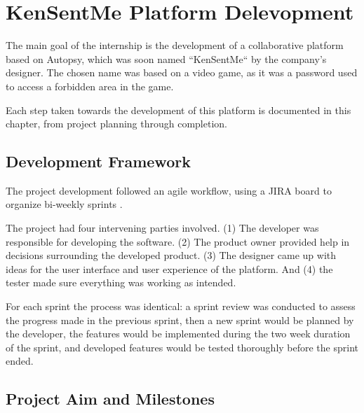 
\chapter{KenSentMe Platform Delevopment}
\label{ch:development}


The main goal of the internship is the development of a collaborative platform based on Autopsy, which was soon named ``KenSentMe`` by the company's designer. 
The chosen name was based on a video game, as it was a password used to access a forbidden area in the game.

Each step taken towards the development of this platform is documented in this chapter, from project planning through completion.

\section{Development Framework}

The project development followed an agile workflow, using a JIRA \cite{jira} board to organize bi-weekly sprints \cite{sprint}.

The project had four intervening parties involved. (1) The developer was responsible for developing the software. (2) The product owner provided help in decisions surrounding the developed product. 
(3) The designer came up with ideas for the user interface and user experience of the platform. And (4) the tester made sure everything was working as intended.

For each sprint the process was identical: a sprint review was conducted to assess the progress made in the previous sprint, then a new sprint would be planned by the developer, 
the features would be implemented during the two week duration of the sprint, and developed features would be tested thoroughly before the sprint ended.

\section{Project Aim and Milestones}

